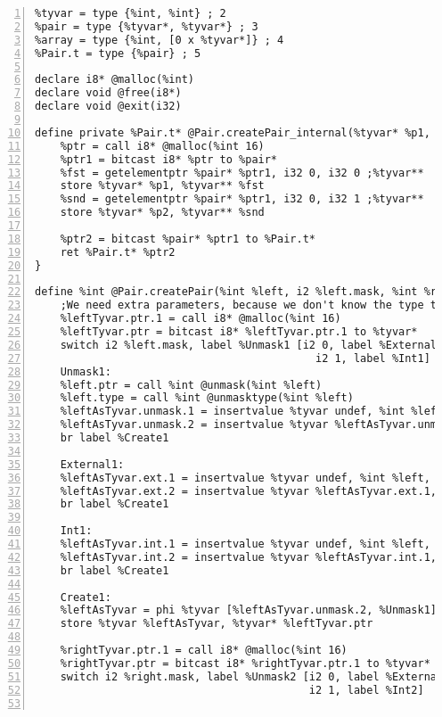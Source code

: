 \begin{lstlisting}[frame=single,numbers=left, language={[x86masm]Assembler}, caption={[Pair Structure: LLVM]Translation of the Pair structure.},
label=llvm:polymorphic]
%int = type i64 ; 1
%tyvar = type {%int, %int} ; 2
%pair = type {%tyvar*, %tyvar*} ; 3
%array = type {%int, [0 x %tyvar*]} ; 4
%Pair.t = type {%pair} ; 5

declare i8* @malloc(%int)
declare void @free(i8*)
declare void @exit(i32)

define private %Pair.t* @Pair.createPair_internal(%tyvar* %p1, %tyvar* %p2){
	%ptr = call i8* @malloc(%int 16)
	%ptr1 = bitcast i8* %ptr to %pair*
	%fst = getelementptr %pair* %ptr1, i32 0, i32 0 ;%tyvar**
	store %tyvar* %p1, %tyvar** %fst
	%snd = getelementptr %pair* %ptr1, i32 0, i32 1 ;%tyvar**
	store %tyvar* %p2, %tyvar** %snd

	%ptr2 = bitcast %pair* %ptr1 to %Pair.t*
	ret %Pair.t* %ptr2
}

define %int @Pair.createPair(%int %left, i2 %left.mask, %int %right, i2 %right.mask){
	;We need extra parameters, because we don't know the type that was passed. Is it an externally defined type, is it an int, or is it a mask?
	%leftTyvar.ptr.1 = call i8* @malloc(%int 16)
	%leftTyvar.ptr = bitcast i8* %leftTyvar.ptr.1 to %tyvar*
	switch i2 %left.mask, label %Unmask1 [i2 0, label %External1
											i2 1, label %Int1]
	Unmask1:
	%left.ptr = call %int @unmask(%int %left)
	%left.type = call %int @unmasktype(%int %left)
	%leftAsTyvar.unmask.1 = insertvalue %tyvar undef, %int %left.ptr, 0
	%leftAsTyvar.unmask.2 = insertvalue %tyvar %leftAsTyvar.unmask.1, %int %left.type, 1
	br label %Create1
	
	External1:
	%leftAsTyvar.ext.1 = insertvalue %tyvar undef, %int %left, 0
	%leftAsTyvar.ext.2 = insertvalue %tyvar %leftAsTyvar.ext.1, %int 0, 1
	br label %Create1

	Int1:
	%leftAsTyvar.int.1 = insertvalue %tyvar undef, %int %left, 0
	%leftAsTyvar.int.2 = insertvalue %tyvar %leftAsTyvar.int.1, %int 1, 1
	br label %Create1

	Create1:
	%leftAsTyvar = phi %tyvar [%leftAsTyvar.unmask.2, %Unmask1], [%leftAsTyvar.ext.2, %External1], [%leftAsTyvar.int.2,%Int1]
	store %tyvar %leftAsTyvar, %tyvar* %leftTyvar.ptr

	%rightTyvar.ptr.1 = call i8* @malloc(%int 16)
	%rightTyvar.ptr = bitcast i8* %rightTyvar.ptr.1 to %tyvar*
	switch i2 %right.mask, label %Unmask2 [i2 0, label %External2
										   i2 1, label %Int2]


\end{lstlisting}
